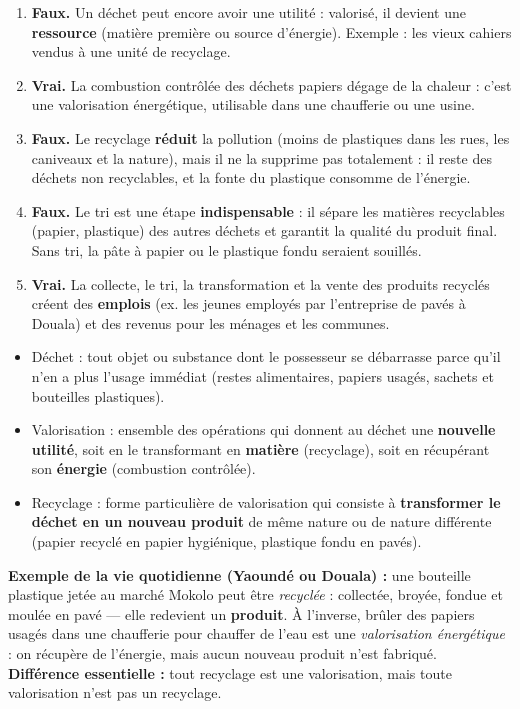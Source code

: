\documentclass[11pt]{article}
\newcommand{\cle}[1]{{\popxbold\color{popdark}#1}}
\begin{document}
\begin{corrige}
\begin{enumerate}
\item \textbf{Faux.} Un déchet peut encore avoir une utilité : valorisé, il devient une \textbf{ressource} (matière première ou source d'énergie). Exemple : les vieux cahiers vendus à une unité de recyclage.
\item \textbf{Vrai.} La combustion contrôlée des déchets papiers dégage de la chaleur : c'est une \cle{valorisation énergétique}, utilisable dans une chaufferie ou une usine.
\item \textbf{Faux.} Le recyclage \textbf{réduit} la pollution (moins de plastiques dans les rues, les caniveaux et la nature), mais il ne la supprime pas totalement : il reste des déchets non recyclables, et la fonte du plastique consomme de l'énergie.
\item \textbf{Faux.} Le \cle{tri} est une étape \textbf{indispensable} : il sépare les matières recyclables (papier, plastique) des autres déchets et garantit la qualité du produit final. Sans tri, la pâte à papier ou le plastique fondu seraient souillés.
\item \textbf{Vrai.} La collecte, le tri, la transformation et la vente des produits recyclés créent des \textbf{emplois} (ex. les jeunes employés par l'entreprise de pavés à Douala) et des revenus pour les ménages et les communes.
\end{enumerate}
\end{corrige}

\begin{corrige}
\begin{definition}
\begin{itemize}
\item \cle{Déchet} : tout objet ou substance dont le possesseur se débarrasse parce qu'il n'en a plus l'usage immédiat (restes alimentaires, papiers usagés, sachets et bouteilles plastiques).
\item \cle{Valorisation} : ensemble des opérations qui donnent au déchet une \textbf{nouvelle utilité}, soit en le transformant en \textbf{matière} (recyclage), soit en récupérant son \textbf{énergie} (combustion contrôlée).
\item \cle{Recyclage} : forme particulière de valorisation qui consiste à \textbf{transformer le déchet en un nouveau produit} de même nature ou de nature différente (papier recyclé en papier hygiénique, plastique fondu en pavés).
\end{itemize}
\end{definition}
\textbf{Exemple de la vie quotidienne (Yaoundé ou Douala) :} une bouteille plastique jetée au marché Mokolo peut être \emph{recyclée} : collectée, broyée, fondue et moulée en pavé — elle redevient un \textbf{produit}. À l'inverse, brûler des papiers usagés dans une chaufferie pour chauffer de l'eau est une \emph{valorisation énergétique} : on récupère de l'énergie, mais aucun nouveau produit n'est fabriqué. \textbf{Différence essentielle :} tout recyclage est une valorisation, mais toute valorisation n'est pas un recyclage.
\end{corrige}
\end{document}
